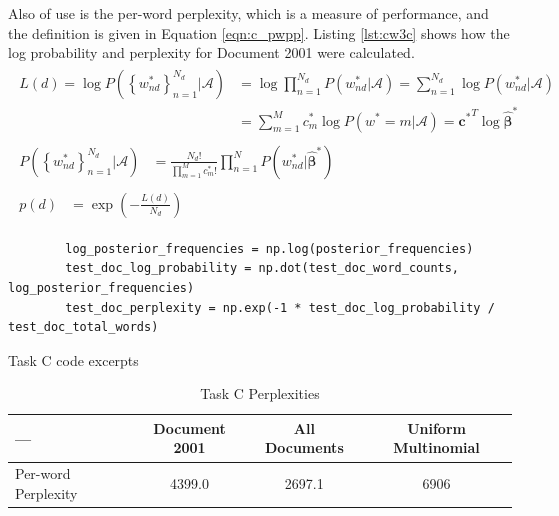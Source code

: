 \documentclass[11pt]{amsart}
\begin{document}
Also of use is the per-word perplexity, which is a measure of performance, and the definition is given in Equation \ref{eqn:c_pwpp}. Listing \ref{lst:cw3c} shows how the log probability and perplexity for Document 2001 were calculated.
\vspace{-0.1cm}
\small
\begin{align}
    \begin{split}  \label{eqn:c_logp}
        L\left(d\right) = \log P\left(\left\{w_{nd}^*\right\}^{N_d}_{n=1} \vert \mathcal{A}\right) & = \log\prod_{n=1}^{N_d}  P\left(w_{nd}^*\vert\mathcal{A}\right)  =  \sum_{n=1}^{N_d} \log P\left(w_{nd}^*\vert\mathcal{A}\right) \\& =\sum_{m=1}^{M} c_m^* \log P\left(w^* = m\vert\mathcal{A}\right)  = {\bm{c}^*}^T \log \hat{\bm{\beta}}^*
    \end{split} \\
    \begin{split} \label{eqn:c_comb}
        P\left(\left\{w_{nd}^*\right\}^{N_d}_{n=1} \vert \mathcal{A}\right) & = \frac{N_d!}{\prod_{m=1}^{M}c_m^*!}\prod_{n=1}^{N}P(w_{nd}^*\vert \hat{\bm{\beta}}^*)
    \end{split}                                                                                                                                                                       \\
    \begin{split} \label{eqn:c_pwpp}
        p(d) & = \exp\left(-\frac{L(d)}{N_d}\right)
    \end{split}
\end{align}
\normalsize

\begin{listing}[h]
    \begin{verbatim}
        log_posterior_frequencies = np.log(posterior_frequencies)
        test_doc_log_probability = np.dot(test_doc_word_counts, log_posterior_frequencies)
        test_doc_perplexity = np.exp(-1 * test_doc_log_probability / test_doc_total_words)
    \end{verbatim}
    \caption{Task C code excerpts} \label{lst:cw3c}
\end{listing}


\begin{table}[h]
    \centering{}
    \begin{center}
        \begin{tabular}{lccc}\toprule
            ---                 & Document 2001 & All Documents & Uniform Multinomial \\ \midrule
            Per-word Perplexity & \num{4399.0}  & \num{2697.1}  & \num{6906}          \\\bottomrule
        \end{tabular}%
        \par\end{center}
    \caption{Task C Perplexities} \label{tab:c_tab}

\end{table}
\end{document}
